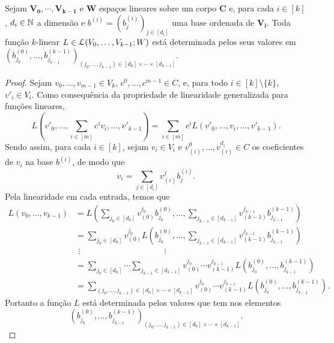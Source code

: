 \begin{prop}
Sejam $\bm{V_0},\cdots,\bm{V_{k-1}}$ e $\bm W$ espaços lineares sobre um corpo $\bm C$ e, para cada $i \in [k]$, $d_i \in \mathbb{N}$ a dimensão e $b^{(i)}=(b^{(i)}_j)_{j \in [d_i]}$ uma base ordenada de $\bm{V_i}$. Toda função $k$-linear $L \in \mathcal{L}(V_0,\ldots,V_{k-1};W)$ está determinada pelos seus valores em $(b^{(0)}_{j_0},\ldots,b^{(k-1)}_{j_{k-1}})_{(j_0,\ldots,j_{k-1}) \in [d_0] \times \cdots \times [d_{k-1}]}$.
\end{prop}
\begin{proof}
Sejam $v_0,\ldots,v_{m-1} \in V_k$, $c^0,\ldots,c^{m-1} \in C$, e, para todo $i \in [k]\setminus \{k\}$, $v'_i \in V_i$. Como consequência da propriedade de linearidade generalizada para funções lineares,
	\begin{equation*}
	L\left(v'_0,\ldots,\sum_{i \in [m]} c^i v_i,\ldots,v'_{k-1} \right) = \sum_{i \in [m]} c^i L\left(v'_0,\ldots,v_i,\ldots,v'_{k-1} \right).
	\end{equation*}
Sendo assim, para cada $i \in [k]$, sejam $v_i \in V_i$ e $v_{(i)}^0,\ldots,v_{(i)}^{d_i} \in C$ os coeficientes de $v_i$ na base $b^{(i)}$, de modo que
	\begin{equation*}
	v_i = \sum_{j \in [d_i]} v_{(i)}^j b^{(i)}_j.
	\end{equation*}
Pela linearidade em cada entrada, temos que
	\begin{align*}
	L(v_0,\ldots,v_{k-1}) &= L\left(\sum_{j_0 \in [d_0]} v_{(0)}^{j_0}b^{(0)}_{j_0},\ldots,\sum_{j_{k-1} \in [d_{k-1}]} v_{(k-1)}^{j_{k-1}} b^{(k-1)}_{j_{k-1}} \right) \\
		&= \sum_{j_0 \in [d_0]} v_{(0)}^{j_0} L\left(b^{(0)}_{j_0},\ldots,\sum_{j_{k-1} \in [d_{k-1}]} v_{(k-1)}^{j_{k-1}} b^{(k-1)}_{j_{k-1}} \right) \\
		&\ \, \vdots\qquad\qquad\qquad\qquad\qquad \vdots \\
		&= \sum_{j_0 \in [d_0]} \cdots \sum_{j_{k-1} \in [d_{k-1}]} v_{(0)}^{j_0} \cdots v_{(k-1)}^{j_{k-1}} L\left(b^{(0)}_{j_0},\ldots,b^{(k-1)}_{j_{k-1}} \right) \\
		&= \sum_{(j_0,\ldots,j_{k-1}) \in [d_0] \times \cdots \times [d_{k-1}]} v_{(0)}^{j_0} \cdots v_{(k-1)}^{j_{k-1}} L\left(b^{(0)}_{j_0},\ldots,b^{(k-1)}_{j_{k-1}} \right).
	\end{align*}
Portanto a função $L$ está determinada pelos valores que tem nos elementos
	\begin{equation*}
	(b^{(0)}_{j_0},\ldots,b^{(k-1)}_{j_{k-1}})_{(j_0,\ldots,j_{k-1}) \in [d_0] \times \cdots \times [d_{k-1}]}.
	\end{equation*}
\end{proof}

